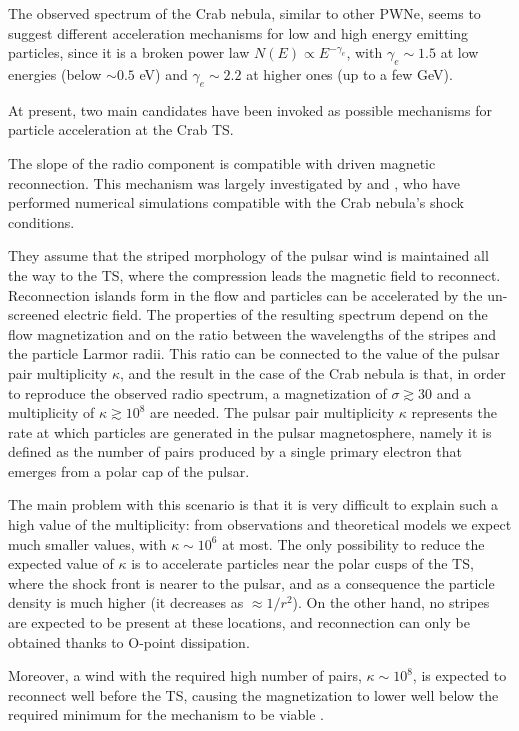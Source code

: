 The observed spectrum of the Crab nebula, similar to other PWNe, seems to suggest different acceleration mechanisms for low and high energy emitting particles, since it is a broken power law $N(E)\propto E^{-\gamma_e}$, with $\gamma_e\sim 1.5$ at low energies (below $\sim 0.5$ eV) and $\gamma_e\sim 2.2$ at higher ones (up to a few GeV).

At present, two main candidates have been invoked as possible mechanisms for particle acceleration at the Crab TS.

The slope of the radio component is compatible with driven magnetic reconnection. 
This mechanism was largely investigated by \citet{Sironi:2011} and \citet{Sironi:2013}, who have performed numerical simulations compatible with the Crab nebula's shock conditions. 

They assume that the striped morphology of the pulsar wind is maintained all the way to the TS, where the compression leads the magnetic field to reconnect. 
Reconnection islands form in the flow and particles can be accelerated by the un-screened electric field. 
The properties of the resulting spectrum depend on the flow magnetization and on the ratio between the wavelengths of the stripes and the particle Larmor radii. 
This ratio can be connected to the value of the pulsar pair multiplicity $\kappa$, and the result in the case of the Crab nebula is that, in order to reproduce the observed radio spectrum, a magnetization of $\sigma\gtrsim 30$ and a multiplicity of $\kappa \gtrsim 10^8$ are needed. The pulsar pair multiplicity $\kappa$ represents the rate at which particles are generated in the pulsar magnetosphere, namely it is defined as the number of pairs produced by a single primary electron that emerges from a polar cap of the pulsar. 

The main problem with this scenario is that it is very difficult to explain such a high value of the multiplicity: from observations and theoretical models we expect much smaller values, with $\kappa\sim 10^6$ at most. 
The only possibility to reduce the expected value of $\kappa$ is to accelerate particles near the polar cusps of the TS, where the shock front is nearer to the pulsar, and as a consequence the particle density is much higher (it decreases as $\approx 1/r^2$). 
On the other hand, no stripes are expected to be present at these locations, and reconnection can only be obtained thanks to O-point dissipation.

Moreover, a wind with the required high number of pairs, $\kappa\sim10^8$, is expected to reconnect well before the TS, causing the magnetization to lower well below the required minimum for the mechanism to be viable \citep{Amato:2014}. 

